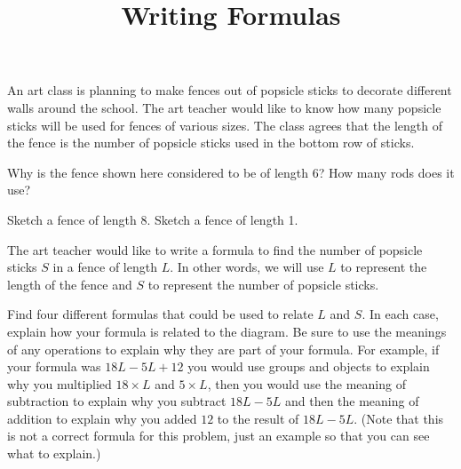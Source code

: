 \documentclass[nooutcomes,noauthor,handout]{ximera}
\title{Writing Formulas}
\begin{document}
\begin{abstract} \end{abstract}
\maketitle




An art class is planning to make fences out of popsicle sticks to decorate different walls around the school. The art teacher would like to know how many popsicle sticks will be used for fences of various sizes. The class agrees that the length of the fence is the number of popsicle sticks used in the bottom row of sticks.
\begin{problem}
 Why is the fence shown here considered to be of length 6?  How many rods does it use?

\begin{image}  \end{image}
\end{problem}

\begin{problem}
 Sketch a fence of length 8.  Sketch a fence of length 1.
\end{problem}

\begin{problem}
The art teacher would like to write a formula to find the number of popsicle sticks $S$ in a fence of length $L$. In other words, we will use $L$ to represent the length of the fence and $S$ to represent the number of popsicle sticks.

Find four different formulas that could be used to relate $L$ and $S$. In each case, explain how your formula is related to the diagram. Be sure to use the meanings of any operations to explain why they are part of your formula. For example, if your formula was $18L - 5L + 12$ you would use groups and objects to explain why you multiplied $18 \times L$ and $5 \times L$, then you would use the meaning of subtraction to explain why you subtract $18L - 5L$ and then the meaning of addition to explain why you added $12$ to the result of $18L - 5L$. (Note that this is not a correct formula for this problem, just an example so that you can see what to explain.)
\end{problem}
\end{document}
